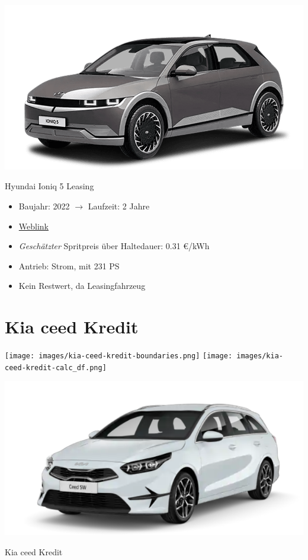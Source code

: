 \documentclass[landscape, DIV=99, 14pt]{scrartcl}
\begin{document}
\pagebreak
\null
\vspace{2cm}
\begin{center}
\includegraphics[width=0.9\columnwidth]{cars/hyundai-ioniq-5.png}

Hyundai Ioniq 5 Leasing
\end{center}

\begin{itemize}
    \item Baujahr: 2022 $\rightarrow$ Laufzeit: 2 Jahre
    \item \href{https://konfigurator.meinauto.de/hyundai/neuwagen/ioniq/angebote/ioniq-5/konfigurator/\#!/extras/-/8865700/14,19,41/private/104690-6897-293274/4864/61e90b0c48e55/leasing/104690-6897-293274/24,9000,15000,0,0,0,0,0,}{Weblink}
    \item \emph{Gesch\"atzter} Spritpreis \"uber Haltedauer: 0.31 \euro{}/kWh
    \item Antrieb: Strom, mit 231 PS
    \item Kein Restwert, da Leasingfahrzeug
\end{itemize}

\pagebreak


\twocolumn

\section*{Kia ceed Kredit}
\begin{center}
\texttt{[image: images/kia-ceed-kredit-boundaries.png]}
\null
\vspace{0.5cm}
\texttt{[image: images/kia-ceed-kredit-calc\_df.png]}
\end{center}

\pagebreak
\null
\vspace{2cm}
\begin{center}
\includegraphics[width=0.9\columnwidth]{cars/kia-ceed-sportswagon.png}

Kia ceed Kredit
\end{center}
\end{document}
